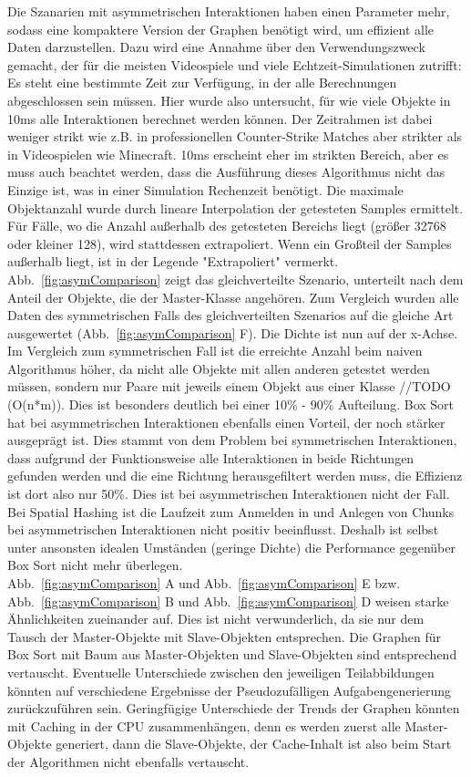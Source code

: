 Die Szanarien mit asymmetrischen Interaktionen haben einen Parameter mehr, sodass eine kompaktere Version der Graphen benötigt wird, um effizient alle Daten darzustellen. Dazu wird eine Annahme über den Verwendungszweck gemacht, der für die meisten Videospiele und viele Echtzeit-Simulationen zutrifft: Es steht eine bestimmte Zeit zur Verfügung, in der alle Berechnungen abgeschlossen sein müssen. Hier wurde also untersucht, für wie viele Objekte in 10ms alle Interaktionen berechnet werden können. Der Zeitrahmen ist dabei weniger strikt wie z.B. in professionellen Counter-Strike Matches aber strikter als in Videospielen wie Minecraft. 10ms erscheint eher im strikten Bereich, aber es muss auch beachtet werden, dass die Ausführung dieses Algorithmus nicht das Einzige ist, was in einer Simulation Rechenzeit benötigt. Die maximale Objektanzahl wurde durch lineare Interpolation der getesteten Samples ermittelt. Für Fälle, wo die Anzahl außerhalb des getesteten Bereichs liegt (größer 32768 oder kleiner 128), wird stattdessen extrapoliert. Wenn ein Großteil der Samples außerhalb liegt, ist in der Legende "Extrapoliert" vermerkt.\\
Abb.~\ref{fig:asymComparison} zeigt das gleichverteilte Szenario, unterteilt nach dem Anteil der Objekte, die der Master-Klasse angehören. Zum Vergleich wurden alle Daten des symmetrischen Falls des gleichverteilten Szenarios auf die gleiche Art ausgewertet (Abb.~\ref{fig:asymComparison} F). Die Dichte ist nun auf der x-Achse. Im Vergleich zum symmetrischen Fall ist die erreichte Anzahl beim naiven Algorithmus höher, da nicht alle Objekte mit allen anderen getestet werden müssen, sondern nur Paare mit jeweils einem Objekt aus einer Klasse //TODO (O(n*m)). Dies ist besonders deutlich bei einer 10\% - 90\% Aufteilung. Box Sort hat bei asymmetrischen Interaktionen ebenfalls einen Vorteil, der noch stärker ausgeprägt ist. Dies stammt von dem Problem bei symmetrischen Interaktionen, dass aufgrund der Funktionsweise alle Interaktionen in beide Richtungen gefunden werden und die eine Richtung herausgefiltert werden muss, die Effizienz ist dort also nur 50\%. Dies ist bei asymmetrischen Interaktionen nicht der Fall. Bei Spatial Hashing ist die Laufzeit zum Anmelden in und Anlegen von Chunks bei asymmetrischen Interaktionen nicht positiv beeinflusst. Deshalb ist selbst unter ansonsten idealen Umständen (geringe Dichte) die Performance gegenüber Box Sort nicht mehr überlegen.\\
Abb.~\ref{fig:asymComparison} A und Abb.~\ref{fig:asymComparison} E bzw. Abb.~\ref{fig:asymComparison} B und Abb.~\ref{fig:asymComparison} D weisen starke Ähnlichkeiten zueinander auf. Dies ist nicht verwunderlich, da sie nur dem Tausch der Master-Objekte mit Slave-Objekten entsprechen. Die Graphen für Box Sort mit Baum aus Master-Objekten und Slave-Objekten sind entsprechend vertauscht. Eventuelle Unterschiede zwischen den jeweiligen Teilabbildungen könnten auf verschiedene Ergebnisse der Pseudozufälligen Aufgabengenerierung zurückzuführen sein. Geringfügige Unterschiede der Trends der Graphen könnten mit Caching in der CPU zusammenhängen, denn es werden zuerst alle Master-Objekte generiert, dann die Slave-Objekte, der Cache-Inhalt ist also beim Start der Algorithmen nicht ebenfalls vertauscht.\\
